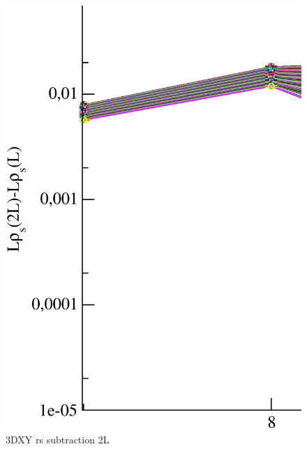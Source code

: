 \begin{figure}[!htpb]
  \centering
  \includegraphics[width=\textwidth]{./plots/3DXY/vsL/rs_subtraction_2L.eps}
  \caption{3DXY rs subtraction 2L}
\end{figure}

